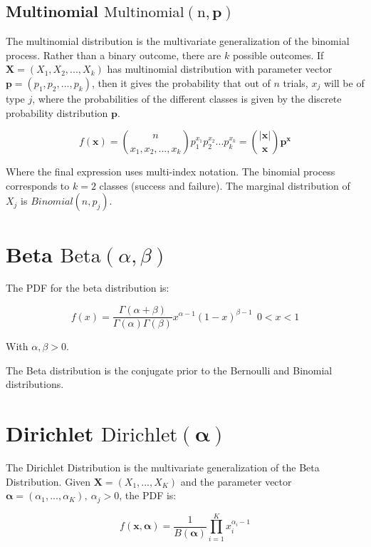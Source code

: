 \subsection{Multinomial $\mathrm{Multinomial(n,\mathbf{p})}$}
The multinomial distribution is the multivariate generalization of the binomial process. Rather than a binary outcome, there are $k$ possible outcomes. If $\mathbf{X}=(X_1,X_2,...,X_k)$ has multinomial distribution with parameter vector $\mathbf{p} = (p_1,p_2,...,p_k)$, then it gives the probability that out of $n$ trials, $x_j$ will be of type $j$, where the probabilities of the different classes is given by the discrete probability distribution $\mathbf{p}$.

\begin{equation}
f(\mathbf{x}) = {n \choose x_1,x_2,...,x_k} p_1^{x_1}p_2^{x_2}...p_k^{x_k} = {|\mathbf{x}|\choose \mathbf{x}}\mathbf{p}^{\mathbf{x}}
\end{equation}

Where the final expression uses multi-index notation. The binomial process corresponds to $k=2$ classes (success and failure). The marginal distribution of $X_j$ is $Binomial(n,p_j)$.


\section{Beta $\mathrm{Beta}(\alpha,\beta)$}

The PDF for the beta distribution is:

\begin{equation}
f(x) = \frac{\Gamma(\alpha + \beta)}{\Gamma(\alpha)\Gamma(\beta)}x^{\alpha-1}(1-x)^{\beta-1}\ \ 0 < x < 1
\end{equation}

With $\alpha, \beta > 0$.

The Beta distribution is the conjugate prior to the Bernoulli and Binomial distributions.

\section{Dirichlet $\mathrm{Dirichlet}(\mathbf{\alpha})$}
The Dirichlet Distribution is the multivariate generalization of the Beta Distribution. Given $\mathbf{X} = (X_1,...,X_K)$ and the parameter vector $\mathbf{\alpha} = (\alpha_1,...,\alpha_K),\ \alpha_j > 0$, the PDF is:

\begin{equation}
f(\mathbf{x},\mathbf{\alpha}) = \frac{1}{B(\mathbf{\alpha})} \prod^K_{i=1} x_i^{\alpha_i -1}
\end{equation}

